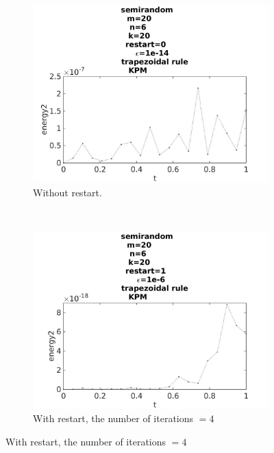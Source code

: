 \begin{figure}[H]
        \centering
        \begin{subfigure}[b]{0.3\textwidth}
                \includegraphics[width=\textwidth]{../MATLAB/fig/energyarnrestart02.jpg}
                \caption{  Without restart. }
                \label{fig:energyarnrestart02}
        \end{subfigure}%
        ~
        \begin{subfigure}[b]{0.3\textwidth}
                \includegraphics[width=\textwidth]{../MATLAB/fig/energyarnrestart22.jpg}
                \caption{ With restart, the number of iterations $ = 4$ }
                \label{fig:energyarnrestart22}
        \end{subfigure}

\end{figure}
